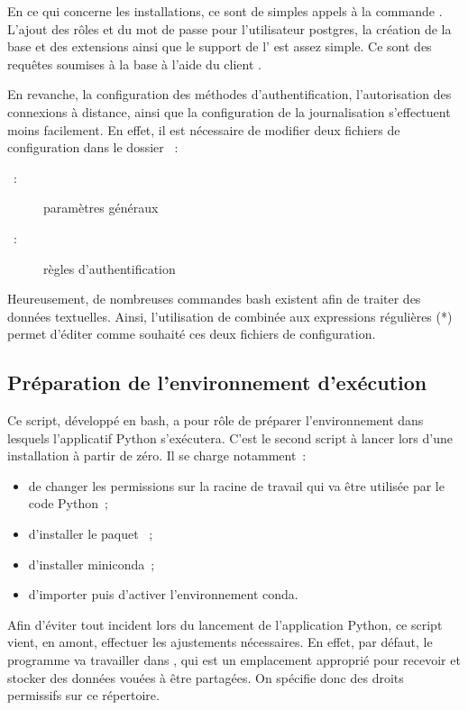 En ce qui concerne les installations, ce sont de simples appels à la commande . L'ajout des rôles et du mot de passe pour l'utilisateur postgres, la création de la base et des extensions ainsi que le support de l' est assez simple. Ce sont des requêtes  soumises à la base à l'aide du client .

En revanche, la configuration des méthodes d'authentification, l'autorisation des connexions à distance, ainsi que la configuration de la journalisation s'effectuent moins facilement. En effet, il est nécessaire de modifier deux fichiers de configuration dans le dossier ~:

\begin{description}
  \item[~:] paramètres généraux
  \item[~:] règles d'authentification
\end{description}

Heureusement, de nombreuses commandes bash existent afin de traiter des données textuelles. Ainsi, l'utilisation de  combinée aux expressions régulières (*) permet d'éditer comme souhaité ces deux fichiers de configuration.

  \subsection{Préparation de l'environnement d'exécution}

Ce script, développé en bash, a pour rôle de préparer l'environnement dans lesquels l'applicatif Python s'exécutera. C'est le second script à lancer lors d'une installation à partir de zéro. Il se charge notamment~:

\begin{itemize}
  \item de changer les permissions sur la racine de travail qui va être utilisée par le code Python~;
  \item d'installer le paquet ~;
  \item d'installer miniconda~;
  \item d'importer puis d'activer l'environnement conda.
\end{itemize}

Afin d'éviter tout incident lors du lancement de l'application Python, ce script vient, en amont, effectuer les ajustements nécessaires. En effet, par défaut, le programme va travailler dans , qui est un emplacement approprié pour recevoir et stocker des données vouées à être partagées. On spécifie donc des droits permissifs sur ce répertoire.

